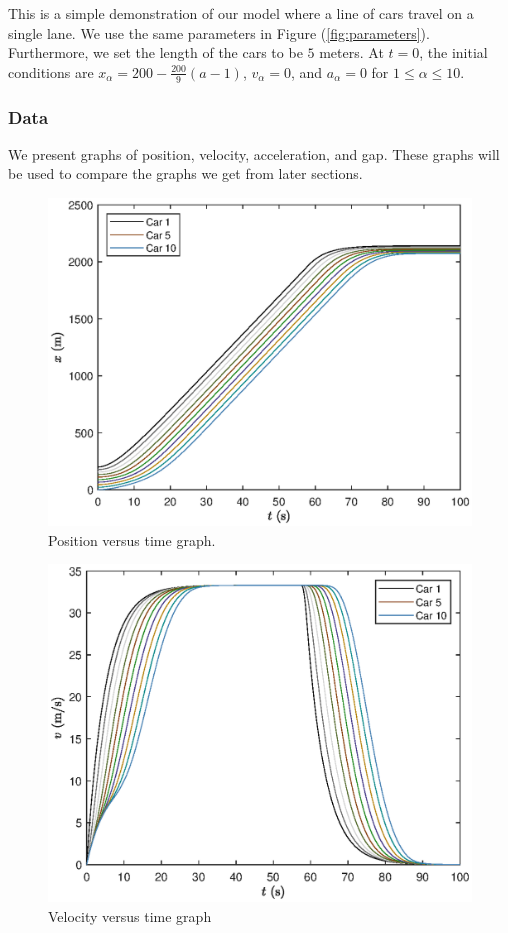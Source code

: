 \documentclass[12pt]{article}
\begin{document}
    This is a simple demonstration of our model where a line of cars travel on a single lane. We use the same parameters in Figure (\ref{fig:parameters}). Furthermore, we set the length of the cars to be $5$ meters. At $t=0$, the initial conditions are $x_\alpha = 
    200-\frac{200}{9}\left(a-1\right)$, $v_\alpha = 0$, and $a_\alpha = 0$ for $1 \leq \alpha \leq 10$. 
    \subsubsection{Data}
    We present graphs of position, velocity, acceleration, and gap. These graphs will be used to compare the graphs we get from later sections. 
    
      \begin{figure}[H]
          \includegraphics[width=13cm]{HomogeneousTraffic1.eps}
          \centering
          \caption{Position versus time graph.}
      \end{figure}

      \begin{figure}[H]
        \includegraphics[width=13cm]{HomogeneousTraffic2.eps}
        \centering
        \caption{Velocity versus time graph}
      \end{figure}
\end{document}
